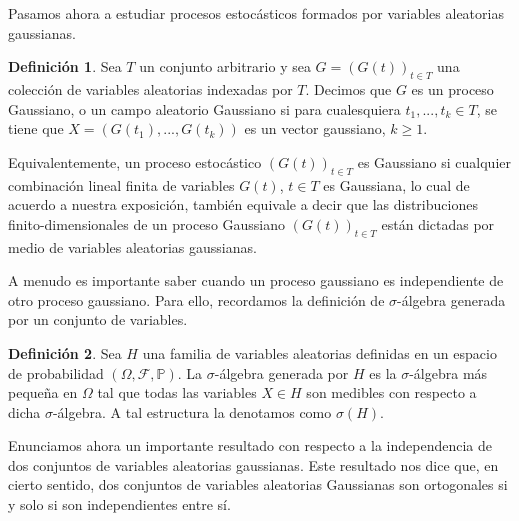\documentclass[letterpaper,twoside,12pt]{book}
\newcommand{\F}{\mathcal{F}}
\renewcommand{\P}{\mathbb{P}}
\newcommand{\1}{\mathds{1}}
\theoremstyle{definition}
\newtheorem{dfn}{Definición}
\theoremstyle{definition}
\theoremstyle{definition}
\theoremstyle{definition}
\theoremstyle{definition}
\theoremstyle{definition}
\theoremstyle{definition}
\begin{document}
 Pasamos ahora a estudiar procesos estocásticos formados por variables aleatorias gaussianas.
\begin{dfn} 
 Sea $T$ un conjunto arbitrario y sea $G=(G(t))_{t\in T}$ una colección de variables aleatorias indexadas por $T$. Decimos que $G$ es un proceso Gaussiano, o un campo aleatorio Gaussiano si para cualesquiera $t_1,...,t_k\in T$, se tiene que $X=(G(t_1),...,G(t_k))$ es un vector gaussiano, $k\geq1$. 
\end{dfn}

Equivalentemente, un proceso estocástico $(G(t))_{t\in T}$ es Gaussiano si cualquier combinación lineal finita de variables $G(t)$, $t\in T$ es Gaussiana, lo cual de acuerdo a nuestra exposición, también equivale a decir que las distribuciones finito-dimensionales de un proceso Gaussiano $(G(t))_{t\in T}$ están dictadas por medio de variables aleatorias gaussianas.

A menudo es importante saber cuando un proceso gaussiano es independiente de otro proceso gaussiano. Para ello, recordamos la definición de $\sigma$-álgebra generada por un conjunto de variables.

\begin{dfn} 
 Sea $H$ una familia de variables aleatorias definidas en un espacio de probabilidad $(\Omega, \F, \P)$. La $\sigma$-álgebra generada por $H$ es la $\sigma$-álgebra más pequeña en $\Omega$ tal que todas las variables $X\in H$ son medibles con respecto a dicha $\sigma$-álgebra. A tal estructura la denotamos como $\sigma(H)$.  
 \end{dfn}
Enunciamos ahora un importante resultado con respecto a la independencia de dos conjuntos de variables aleatorias gaussianas. Este resultado nos dice que, en cierto sentido, dos conjuntos de variables aleatorias Gaussianas son ortogonales si y solo si son independientes entre sí. 
\end{document}
